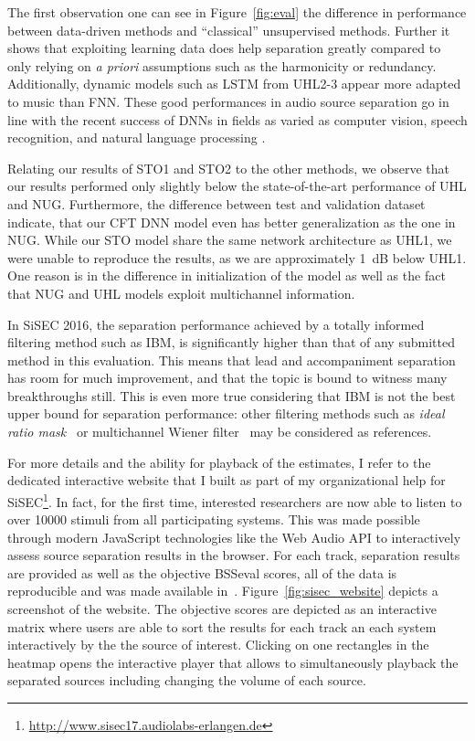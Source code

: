 The first observation one can see in Figure~\ref{fig:eval} the difference in performance between data-driven methods and ``classical'' unsupervised methods. 
Further it shows that exploiting learning data does help separation greatly compared to only relying on \textit{a priori} assumptions such as the harmonicity or redundancy. Additionally, dynamic models such as LSTM from UHL2-3 appear more adapted to music than FNN. 
These good performances in audio source separation go in line with the recent success of DNNs in fields as varied as computer vision, speech recognition, and natural language processing \cite{lecun15}.
\par
Relating our results of STO1 and STO2 to the other methods, we observe that our results performed only slightly below the state-of-the-art performance of UHL and NUG.
Furthermore, the difference between test and validation dataset indicate, that our CFT DNN model even has better generalization as the one in NUG. 
While our STO model share the same network architecture as UHL1, we were unable to reproduce the results, as we are approximately 1~dB below UHL1.
One reason is in the difference in initialization of the model as well as the fact that NUG and UHL models exploit multichannel information. 
\par
In SiSEC 2016, the separation performance achieved by a totally informed filtering method such as IBM, is significantly higher than that of any submitted method in this evaluation. 
This means that lead and accompaniment separation has room for much improvement, and that the topic is bound to witness many breakthroughs still. 
This is even more true considering that IBM is not the best upper bound for separation performance: other filtering methods such as \textit{ideal ratio mask}~\cite{liutkus15c} or multichannel Wiener filter~\cite{duong10} may be considered as references.
\par
For more details and the ability for playback of the estimates, I refer to the dedicated interactive website that I built as part of my organizational help for SiSEC\footnote{\url{http://www.sisec17.audiolabs-erlangen.de}}.
In fact, for the first time, interested researchers are now able to listen to over 10000 stimuli from all participating systems.
This was made possible through modern JavaScript technologies like the Web Audio API to interactively assess source separation results in the browser.
For each track, separation results are provided as well as the objective BSSeval scores, all of the data is reproducible and was made available in~\cite{oss_sisecwebsite}.
Figure~\ref{fig:sisec_website} depicts a screenshot of the website.
The objective scores are depicted as an interactive matrix where users are able to sort the results for each track an each system interactively by the the source of interest.
Clicking on one rectangles in the heatmap opens the interactive player that allows to simultaneously playback the separated sources including changing the volume of each source.

